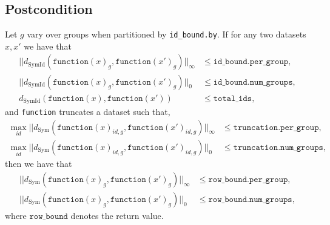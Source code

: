 \documentclass{article}
\begin{document}
\subsection*{Postcondition}
\begin{theorem}[Postcondition]
    Let $g$ vary over groups when partitioned by \texttt{id\_bound.by}.
    If for any two datasets $x, x'$ we have that
    \begin{align*}
        ||d_{\mathrm{SymId}}(\texttt{function}(x)_{g}, \texttt{function}(x')_{g})||_\infty &\le \texttt{id\_bound.per\_group}, \\
        ||d_{\mathrm{SymId}}(\texttt{function}(x)_{g}, \texttt{function}(x')_{g})||_0 &\le \texttt{id\_bound.num\_groups}, \\
        d_{\mathrm{SymId}}(\texttt{function}(x), \texttt{function}(x')) &\le \texttt{total\_ids},
    \end{align*}
    and \texttt{function} truncates a dataset such that,
    \begin{align*}
        \max_{id} ||d_{\mathrm{Sym}}(\texttt{function}(x)_{id,g}, \texttt{function}(x')_{id,g})||_\infty &\le \texttt{truncation.per\_group}, \\
        \max_{id} ||d_{\mathrm{Sym}}(\texttt{function}(x)_{id,g}, \texttt{function}(x')_{id,g})||_0 &\le \texttt{truncation.num\_groups},
    \end{align*}
    then we have that
    \begin{align*}
        ||d_{\mathrm{Sym}}(\texttt{function}(x)_{g}, \texttt{function}(x')_{g})||_\infty &\le \texttt{row\_bound.per\_group}, \\
        ||d_{\mathrm{Sym}}(\texttt{function}(x)_{g}, \texttt{function}(x')_{g})||_0 &\le \texttt{row\_bound.num\_groups},
    \end{align*}
    where $\texttt{row\_bound}$ denotes the return value.
\end{theorem}
\end{document}
